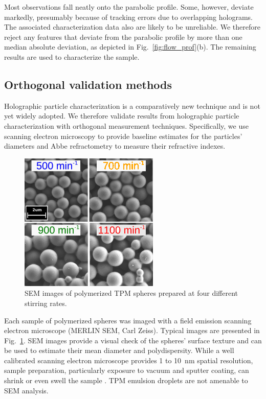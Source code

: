 \documentclass[journal=langd5,manuscript=article,layout=twocolumn]{achemso}
\begin{document}
Most observations fall neatly onto the parabolic profile.
Some, however, deviate markedly, presumably because
of tracking errors due to overlapping holograms.
The associated characterization data also are likely
to be unreliable.
We therefore reject any features that deviate from
the parabolic profile by more than one median absolute deviation,
as depicted in Fig.~\ref{fig:flow_prof}(b). The remaining results are used
to characterize the sample.

\subsection{Orthogonal validation methods}
\label{sec:orthogonalmethods}

Holographic particle characterization is a comparatively new technique
and is not yet widely adopted. We therefore validate results from
holographic particle characterization with 
orthogonal measurement techniques.
Specifically, we use scanning electron microscopy to provide baseline estimates for the
particles' diameters and Abbe refractometry to measure their refractive indexes.

\begin{figure}
    \centering
    \includegraphics[width=0.8\columnwidth]{semimages03.png}
    \caption{SEM images of polymerized TPM spheres
    prepared at four different stirring rates.}
    \label{fig:semimages}
\end{figure}

Each sample of polymerized spheres was imaged with a 
field emission scanning electron microscope
(MERLIN SEM, Carl Zeiss).
Typical images are presented in Fig.~\ref{fig:semimages}.
SEM images provide a visual check of the spheres' surface
texture and can be used to estimate their mean
diameter and polydispersity.
While a well calibrated scanning
electron microscope provides \num{1} to \SI{10}{\nm} spatial resolution, sample
preparation, particularly exposure to vacuum and sputter coating, can shrink or 
even swell the sample \cite{yamada85,jung02}.
TPM emulsion droplets
are not amenable to SEM analysis.
\end{document}
